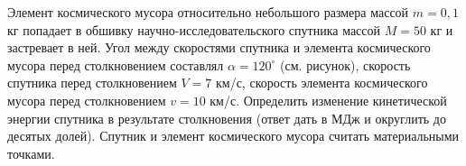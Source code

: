 
Элемент космического мусора относительно небольшого размера массой $m=0,1$ кг попадает в обшивку 
научно-исследовательского спутника массой $M=50$ кг и застревает в ней. Угол между скоростями спутника и элемента 
космического мусора перед столкновением составлял $\alpha=120^{\circ}$ (см. рисунок), скорость спутника перед 
столкновением $V=7$ км/с, скорость элемента космического мусора перед столкновением $v=10$ км/с. Определить 
изменение кинетической энергии спутника в результате столкновения (ответ дать в МДж и округлить до десятых долей). 
Спутник и элемент космического мусора считать материальными точками.

